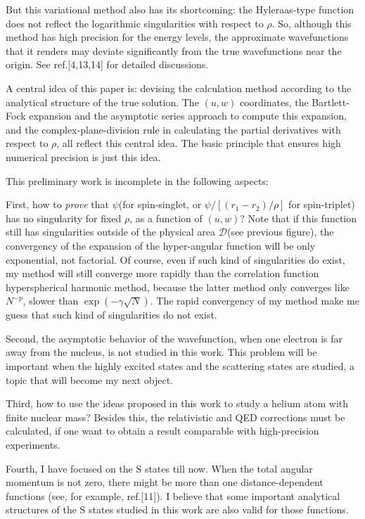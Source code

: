 But this variational method also has its shortcoming: the Hyleraas-type
function does not reflect the logarithmic singularities with respect to
$\rho$. So, although this method has high precision for the energy levels,
the approximate wavefunctions that it renders may deviate significantly
from the true wavefunctions near the origin. See ref.[4,13,14] for detailed
discussions.

A central idea of this paper is: devising the calculation method
according to the analytical structure of the true solution. The $(u,w)$
coordinates, the Bartlett-Fock expansion and the asymptotic series approach
to compute this expansion, and the complex-plane-division rule in calculating
the partial derivatives with respect to $\rho$, all reflect this central
idea. The basic principle that ensures high numerical precision is just
this idea.

This preliminary work is incomplete in the following aspects:

First, how to \emph{prove} that $\psi$(for spin-singlet, or 
$\psi/[(r_{1}-r_{2})/\rho]$ for spin-triplet) has no singularity for fixed $\rho$,
as a function of $(u,w)$? Note that if this function still has singularities outside
of the physical area $\mathcal{D}$(see previous figure), the convergency of
the expansion of the hyper-angular function
will be only exponential, not factorial. Of course, even if
such kind of singularities do exist, my method will still converge more rapidly
than the correlation function hyperspherical harmonic method, because the latter
method only converges like $N^{-p}$, slower than $\exp(-\gamma\sqrt{N})$.
The rapid convergency of my method make me guess that such kind of singularities
do not exist.

Second, the asymptotic behavior of the wavefunction, when one electron is
far away from the nucleus, is not studied in this work. This problem
will be important when the highly excited states and the scattering states are
studied, a topic that will become my next object. 

Third, how to use the ideas proposed in this work to study a helium atom
with finite nuclear mass? Besides this, the relativistic and QED corrections
must be calculated, if one want to obtain a result comparable with
high-precision experiments.

Fourth, I have focused on the S states till now. When the total angular momentum
is not zero, there might be more than one distance-dependent functions (see, for
example, ref.[11]). I believe that some important analytical structures of the
S states studied in this work are also valid for those functions.


